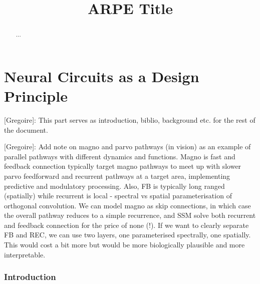 \documentclass{article}
\title{ARPE Title}
\author{}
\newcommand{\greg}[1]{{\color{indigo}[Gregoire]: #1}}
\begin{document}
\doparttoc %
\faketableofcontents %

\maketitle

\begin{abstract}
...
\end{abstract}

\part{Neural Circuits as a Design Principle} %


\greg{This part serves as introduction, biblio, background etc. for the rest of the document.}

\greg{Add note on magno and parvo pathways (in vision) as an example of parallel pathways with different dynamics and functions. Magno is fast and feedback connection typically target magno pathways to meet up with slower parvo feedforward and recurrent pathways at a target area, implementing predictive and modulatory processing. Also, FB is typically long ranged (spatially) while recurrent is local - spectral vs spatial parameterisation of orthogonal convolution. We can model magno as skip connections, in which case the overall pathway reduces to a simple recurrence, and SSM solve both recurrent and feedback connection for the price of none (!). If we want to clearly separate FB and REC, we can use two layers, one parameterised spectrally, one spatially. This would cost a bit more but would be more biologically plausible and more interpretable.}

\section{Introduction}
\end{document}
